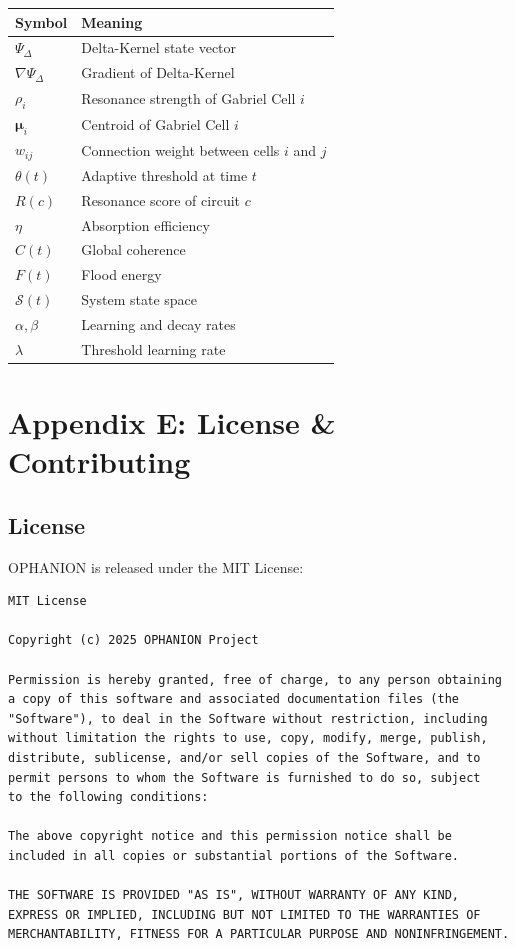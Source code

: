 \documentclass[11pt,a4paper]{article}
\begin{document}
\begin{table}[h]
\centering
\begin{tabular}{@{}ll@{}}
\toprule
\textbf{Symbol} & \textbf{Meaning} \\ \midrule
$\Psi_\Delta$ & Delta-Kernel state vector \\
$\nabla \Psi_\Delta$ & Gradient of Delta-Kernel \\
$\rho_i$ & Resonance strength of Gabriel Cell $i$ \\
$\boldsymbol{\mu}_i$ & Centroid of Gabriel Cell $i$ \\
$w_{ij}$ & Connection weight between cells $i$ and $j$ \\
$\theta(t)$ & Adaptive threshold at time $t$ \\
$R(c)$ & Resonance score of circuit $c$ \\
$\eta$ & Absorption efficiency \\
$C(t)$ & Global coherence \\
$F(t)$ & Flood energy \\
$\mathcal{S}(t)$ & System state space \\
$\alpha, \beta$ & Learning and decay rates \\
$\lambda$ & Threshold learning rate \\
\bottomrule
\end{tabular}
\end{table}

\section{Appendix E: License \& Contributing}

\subsection{License}

OPHANION is released under the MIT License:

\begin{verbatim}
MIT License

Copyright (c) 2025 OPHANION Project

Permission is hereby granted, free of charge, to any person obtaining 
a copy of this software and associated documentation files (the 
"Software"), to deal in the Software without restriction, including 
without limitation the rights to use, copy, modify, merge, publish, 
distribute, sublicense, and/or sell copies of the Software, and to 
permit persons to whom the Software is furnished to do so, subject 
to the following conditions:

The above copyright notice and this permission notice shall be 
included in all copies or substantial portions of the Software.

THE SOFTWARE IS PROVIDED "AS IS", WITHOUT WARRANTY OF ANY KIND, 
EXPRESS OR IMPLIED, INCLUDING BUT NOT LIMITED TO THE WARRANTIES OF 
MERCHANTABILITY, FITNESS FOR A PARTICULAR PURPOSE AND NONINFRINGEMENT.
\end{verbatim}
\end{document}

